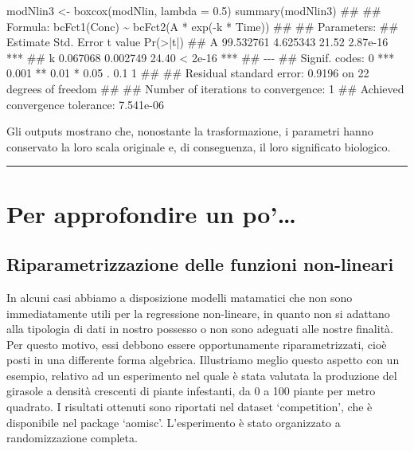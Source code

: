 \documentclass[a4paper,12pt,oneside]{book}
\newenvironment{Shaded}{\begin{snugshade}}{\end{snugshade}}
\newcommand{\FloatTok}[1]{#1}
\newcommand{\DocumentationTok}[1]{#1}
\newcommand{\OtherTok}[1]{#1}
\newcommand{\FunctionTok}[1]{#1}
\newcommand{\AttributeTok}[1]{#1}
\newcommand{\NormalTok}[1]{#1}
\begin{document}
\begin{Shaded}
\begin{Highlighting}[]
\NormalTok{modNlin3 }\OtherTok{\textless{}{-}} \FunctionTok{boxcox}\NormalTok{(modNlin, }\AttributeTok{lambda =} \FloatTok{0.5}\NormalTok{)}
\FunctionTok{summary}\NormalTok{(modNlin3)}
\DocumentationTok{\#\# }
\DocumentationTok{\#\# Formula: bcFct1(Conc) \textasciitilde{} bcFct2(A * exp({-}k * Time))}
\DocumentationTok{\#\# }
\DocumentationTok{\#\# Parameters:}
\DocumentationTok{\#\#    Estimate Std. Error t value Pr(\textgreater{}|t|)    }
\DocumentationTok{\#\# A 99.532761   4.625343   21.52 2.87e{-}16 ***}
\DocumentationTok{\#\# k  0.067068   0.002749   24.40  \textless{} 2e{-}16 ***}
\DocumentationTok{\#\# {-}{-}{-}}
\DocumentationTok{\#\# Signif. codes:  0 \textquotesingle{}***\textquotesingle{} 0.001 \textquotesingle{}**\textquotesingle{} 0.01 \textquotesingle{}*\textquotesingle{} 0.05 \textquotesingle{}.\textquotesingle{} 0.1 \textquotesingle{} \textquotesingle{} 1}
\DocumentationTok{\#\# }
\DocumentationTok{\#\# Residual standard error: 0.9196 on 22 degrees of freedom}
\DocumentationTok{\#\# }
\DocumentationTok{\#\# Number of iterations to convergence: 1 }
\DocumentationTok{\#\# Achieved convergence tolerance: 7.541e{-}06}
\end{Highlighting}
\end{Shaded}

Gli outputs mostrano che, nonostante la trasformazione, i parametri hanno conservato la loro scala originale e, di conseguenza, il loro significato biologico.

\begin{center}\rule{0.5\linewidth}{0.5pt}\end{center}

\hypertarget{per-approfondire-un-po-1}{%
\section{Per approfondire un po'\ldots{}}\label{per-approfondire-un-po-1}}

\hypertarget{riparametrizzazione-delle-funzioni-non-lineari}{%
\subsection{Riparametrizzazione delle funzioni non-lineari}\label{riparametrizzazione-delle-funzioni-non-lineari}}

In alcuni casi abbiamo a disposizione modelli matamatici che non sono immediatamente utili per la regressione non-lineare, in quanto non si adattano alla tipologia di dati in nostro possesso o non sono adeguati alle nostre finalità. Per questo motivo, essi debbono essere opportunamente riparametrizzati, cioè posti in una differente forma algebrica. Illustriamo meglio questo aspetto con un esempio, relativo ad un esperimento nel quale è stata valutata la produzione del girasole a densità crescenti di piante infestanti, da 0 a 100 piante per metro quadrato. I risultati ottenuti sono riportati nel dataset `competition', che è disponibile nel package `aomisc'. L'esperimento è stato organizzato a randomizzazione completa.
\end{document}
